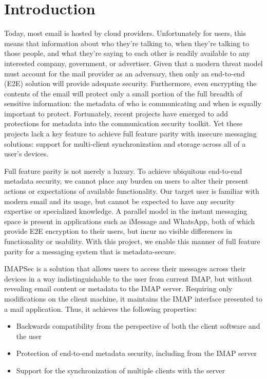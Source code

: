 \documentclass[pageno]{jpaper}
\newcommand{\project}{IMAPSec }
\begin{document}
\newpage

\tableofcontents

\newpage

\section{Introduction}

Today, most email is hosted by cloud providers. Unfortunately for users, this means that information about who they're talking to, when they're talking to those people, and what they're saying to each other is readily available to any interested company, government, or advertiser. Given that a modern threat model must account for the mail provider as an adversary, then only an end-to-end (E2E) solution will provide adequate security. Furthermore, even encrypting the contents of the email will protect only a small portion of the full breadth of sensitive information: the metadata of who is communicating and when is equally important to protect. Fortunately, recent projects have emerged to add protections for metadata into the communication security toolkit. Yet these projects lack a key feature to achieve full feature parity with insecure messaging solutions: support for multi-client synchronization and storage across all of a user's devices.

Full feature parity is not merely a luxury. To achieve ubiquitous end-to-end metadata security, we cannot place any burden on users to alter their present actions or expectations of available functionality. Our target user is familiar with modern email and its usage, but cannot be expected to have any security expertise or specialized knowledge. A parallel model in the instant messaging space is present in applications such as iMessage and WhatsApp, both of which provide E2E encryption to their users, but incur no visible differences in functionality or usability. With this project, we enable this manner of full feature parity for a messaging system that is metadata-secure.

\project is a solution that allows users to access their messages across their devices in a way indistinguishable to the user from current IMAP, but without revealing email content or metadata to the IMAP server. Requiring only modifications on the client machine, it maintains the IMAP interface presented to a mail application. Thus, it achieves the following properties:

\begin{itemize}
  \item Backwards compatibility from the perspective of both the client software and the user
  \item Protection of end-to-end metadata security, including from the IMAP server
  \item Support for the synchronization of multiple clients with the server
\end{itemize}
\end{document}
